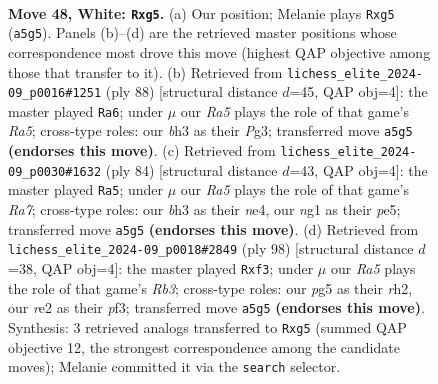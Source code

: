 \documentclass[11pt]{article}
\begin{document}
\clearpage

\begin{figure}[p]\centering
\begin{subfigure}{0.46\textwidth}\centering
\resizebox{\linewidth}{!}{%
\newchessgame
\chessboard[
  setfen={8/7p/3r1p1k/R5p1/1p2PKP1/7b/4r3/6n1 w - - 0 48},
  showmover=false,
  pgfstyle=straightmove, color=movearrow, markmove={a5-g5}
]}
\caption{}
\end{subfigure}\hfill
\begin{subfigure}{0.46\textwidth}\centering
\resizebox{\linewidth}{!}{%
\newchessgame
\chessboard[
  setfen={8/5p2/4pk1p/R5p1/1N3P2/2r3P1/6K1/8 w - - 0 45},
  showmover=false,
  pgfstyle=straightmove, color=movearrow, markmove={a5-a6}
]}
\caption{}
\end{subfigure}
\\[4pt]
\begin{subfigure}{0.46\textwidth}\centering
\resizebox{\linewidth}{!}{%
\newchessgame
\chessboard[
  setfen={8/R5p1/5pk1/1p2p3/4n2p/6P1/6KP/8 w - - 0 43},
  showmover=false,
  pgfstyle=straightmove, color=movearrow, markmove={a7-a5}
]}
\caption{}
\end{subfigure}\hfill
\begin{subfigure}{0.46\textwidth}\centering
\resizebox{\linewidth}{!}{%
\newchessgame
\chessboard[
  setfen={7r/8/5nk1/p7/1b2p1p1/1R3pP1/5P1r/6K1 w - - 0 50},
  showmover=false,
  pgfstyle=straightmove, color=movearrow, markmove={b3-f3}
]}
\caption{}
\end{subfigure}
\caption{\textbf{Move 48, White: \texttt{Rxg5}.} (a) Our position; Melanie plays \texttt{Rxg5} (\texttt{a5g5}). Panels (b)--(d) are the retrieved master positions whose correspondence most drove this move (highest QAP objective among those that transfer to it). (b) Retrieved from \texttt{lichess\_elite\_2024-09\_p0016\#1251} (ply 88) [structural distance $d$=45, QAP obj=4]: the master played \texttt{Ra6}; under $\mu$ our \emph{Ra5} plays the role of that game's \emph{Ra5}; cross-type roles: our \emph{b}h3 as their \emph{P}g3; transferred move \texttt{a5g5} \textbf{(endorses this move)}. (c) Retrieved from \texttt{lichess\_elite\_2024-09\_p0030\#1632} (ply 84) [structural distance $d$=43, QAP obj=4]: the master played \texttt{Ra5}; under $\mu$ our \emph{Ra5} plays the role of that game's \emph{Ra7}; cross-type roles: our \emph{b}h3 as their \emph{n}e4, our \emph{n}g1 as their \emph{p}e5; transferred move \texttt{a5g5} \textbf{(endorses this move)}. (d) Retrieved from \texttt{lichess\_elite\_2024-09\_p0018\#2849} (ply 98) [structural distance $d$=38, QAP obj=4]: the master played \texttt{Rxf3}; under $\mu$ our \emph{Ra5} plays the role of that game's \emph{Rb3}; cross-type roles: our \emph{p}g5 as their \emph{r}h2, our \emph{r}e2 as their \emph{p}f3; transferred move \texttt{a5g5} \textbf{(endorses this move)}. Synthesis: 3 retrieved analogs transferred to \texttt{Rxg5} (summed QAP objective 12, the strongest correspondence among the candidate moves); Melanie committed it via the \texttt{search} selector.}
\label{fig:thought-m94}
\end{figure}
\end{document}
